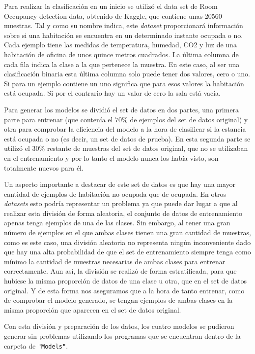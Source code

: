 \documentclass[a4paper, 12pt]{book}
\begin{document}
Para realizar la clasificación en un inicio se utilizó el data set de Room Occupancy detection data\cite{DataSetOccupancy}, obtenido de Kaggle, que contiene unas 20560 muestras. Tal y como su nombre indica, este \textit{dataset} proporcionará información sobre si una habitación se encuentra en un determinado instante ocupada o no. Cada ejemplo tiene las medidas de temperatura, humedad, CO2 y luz de una habitación de oficina de unos quince metros cuadrados. La última columna de cada fila indica la clase a la que pertenece la muestra. En este caso, al ser una clasificación binaria esta última columna solo puede tener dos valores, cero o uno. Si para un ejemplo contiene un uno significa que para esos valores la habitación está ocupada. Si por el contrario hay un valor de cero la sala está vacía. 

Para generar los modelos se dividió el set de datos en dos partes, una primera parte para entrenar (que contenía el $70\%$ de ejemplos del set de datos original) y otra para comprobar la eficiencia del modelo a la hora de clasificar si la estancia está ocupada o no (es decir, un set de datos de prueba). En esta segunda parte se utilizó el $30\%$ restante de muestras del set de datos original, que no se utilizaban en el entrenamiento y por lo tanto el modelo nunca los había visto, son totalmente nuevos para él.

Un aspecto importante a destacar de este set de datos es que hay una mayor cantidad de ejemplos de habitación no ocupada que de ocupada. En otros \textit{datasets} esto podría representar un problema ya que puede dar lugar a que al realizar esta división de forma aleatoria, el conjunto de datos de entrenamiento apenas tenga ejemplos de una de las clases. Sin embargo, al tener una gran número de ejemplos en el que ambas clases tienen una gran cantidad de muestras, como es este caso, una división aleatoria no representa ningún inconveniente dado que hay una alta probabilidad de que el set de entrenamiento siempre tenga como mínimo la cantidad de muestras necesarias de ambas clases para entrenar correctamente. Aun así, la división se realizó de forma estratificada, para que hubiese la misma proporción de datos de una clase u otra, que en el set de datos original. Y de esta forma nos aseguramos que a la hora de tanto entrenar, como de comprobar el modelo generado, se tengan ejemplos de ambas clases en la misma proporción que aparecen en el set de datos original.

Con esta división y preparación de los datos, los cuatro modelos se pudieron generar sin problemas utilizando los programas que se encuentran dentro de la carpeta de \texttt{"Models"}.  
\end{document}
